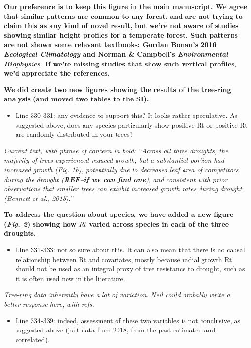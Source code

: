 \documentclass[
]{article}
\providecommand{\tightlist}{%
  \setlength{\itemsep}{0pt}\setlength{\parskip}{0pt}}
\begin{document}
\textbf{Our preference is to keep this figure in the main manuscript. We
agree that similar patterns are common to any forest, and are not trying
to claim this as any kind of novel result, but we're not aware of
studies showing similar height profiles for a temperate forest. Such
patterns are not shown some relevant textbooks: Gordan Bonan's 2016
\emph{Ecological Climatology} and Norman \& Campbell's
\emph{Environmental Biophysics}. If we're missing studies that show such
vertical profiles, we'd appreciate the references.}

\textbf{We did create two new figures showing the results of the
tree-ring analysis (and moved two tables to the SI).}

\begin{itemize}
\tightlist
\item
  Line 330-331: any evidence to support this? It looks rather
  speculative. As suggested above, does any species particularly show
  positive Rt or positive Rt are randomly distributed in your trees?
\end{itemize}

\emph{Current text, with phrase of concern in bold: ``Across all three
droughts, the majority of trees experienced reduced growth, but a
substantial portion had increased growth (Fig. 1b), potentially due to
decreased leaf area of competitors during the drought (\textbf{REF--if
we can find one}), and consistent with prior observations that smaller
trees can exhibit increased growth rates during drought (Bennett
\emph{et al.}, 2015).'' }

\textbf{To address the question about species, we have added a new
figure (\emph{Fig. 2}) showing how \(Rt\) varied across species in each
of the three droughts.}

\begin{itemize}
\tightlist
\item
  Line 331-333: not so sure about this. It can also mean that there is
  no causal relationship between Rt and covariates, mostly because
  radial growth Rt should not be used as an integral proxy of tree
  resistance to drought, such as it is often used now in the literature.
\end{itemize}

\emph{Tree-ring data inherently have a lot of variation. Neil could
probably write a better response here, with refs.}

\begin{itemize}
\tightlist
\item
  Line 334-339: indeed, assessment of these two variables is not
  conclusive, as suggested above (just data from 2018, from the past
  estimated and correlated).
\end{itemize}
\end{document}
